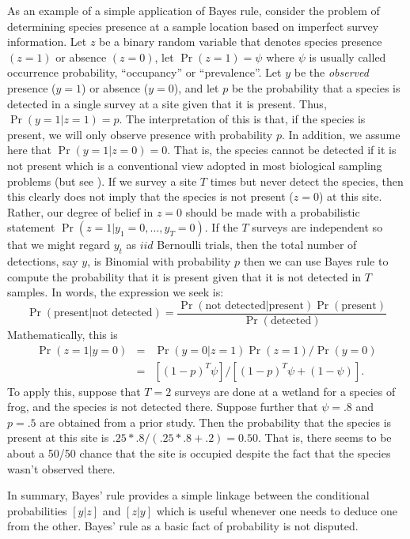 As an example of a simple application of Bayes rule,
consider the problem of determining species presence at a sample
location based on imperfect survey information. Let $z$ be a binary
random variable that denotes species presence $(z=1)$ or absence
$(z=0)$, let $\Pr(z=1) = \psi$ where $\psi$ is usually called
occurrence probability, ``occupancy'' \citep{mackenzie_etal:2002} or ``prevalence''.
Let $y$ be the {\it observed} presence
($y=1$) or absence ($y=0$), and let $p$ be the probability that a
species is detected in a single survey at a site given that it is
present. Thus, $\Pr(y=1|z=1)=p$. The interpretation of this is that,
if the species is present, we will only observe presence with
probability $p$. In addition, we assume here that $\Pr(y=1|z=0) =
0$. That is, the species cannot be detected if it is not present which
is a conventional view adopted in most biological sampling problems (but
see \citet{royle_link:2006}).
If we survey a site $T$ times but never detect the species,
then this clearly does not imply that the species is not present
($z=0$) at this site. Rather, our degree of belief in $z=0$ should be
made with a probabilistic statement
$\Pr(z=1|y_1=0,\ldots,y_{T}=0)$. If the $T$ surveys are independent so
that we might regard $y_{t}$ as $iid$ Bernoulli trials, then the total
number of detections, say $y$, is Binomial with probability $p$ then
we can use Bayes rule to compute the probability that it is present
given that it is not detected in $T$ samples. In words, the expression
we seek is:
\[
\Pr(\mbox{present} | \mbox{not detected}) = \frac{\Pr(\mbox{not detected} |
  \mbox{present})\Pr(\mbox{present})}{\Pr(\mbox{detected})}
\]
Mathematically, this is
\begin{eqnarray*}
\Pr(z=1|y=0) &= &\Pr(y=0|z=1)\Pr(z=1)/\Pr(y=0)  \\
             &= & [(1-p)^{T} \psi]/[ (1-p)^T \psi + (1-\psi) ].
\end{eqnarray*}
To apply this,
suppose that $T=2$ surveys are done at a wetland for a species of
frog, and the species is not detected there. Suppose further that $\psi
= .8$ and $p = .5$ are obtained from a prior study.  Then the
probability that the species is present at this site is
$.25*.8/(.25*.8 + .2) = 0.50$. That is, there seems to be about a
50/50 chance that the site is occupied despite the fact that the
species wasn't observed there.

In summary, Bayes' rule provides a simple linkage between the
conditional probabilities $[y|z]$ and $[z|y]$ which is useful whenever
one needs to deduce one from the other.
Bayes' rule as a basic fact of probability is not disputed.


